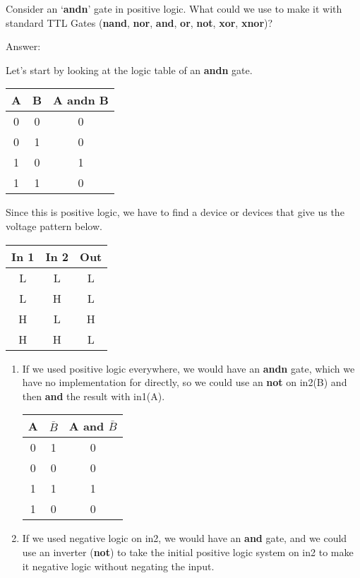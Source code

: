 \begin{example}
Consider an `\textbf{andn}' gate in positive logic.  What could we use to make it with standard TTL Gates (\textbf{nand}, \textbf{nor}, \textbf{and}, \textbf{or}, \textbf{not}, \textbf{xor}, \textbf{xnor})?

Answer:

Let's start by looking at the logic table of an \textbf{andn} gate.

\begin{tabular}{c|c||c}
A & B & A andn B \\\hline
0 & 0 & 0 \\
0 & 1 & 0 \\
1 & 0 & 1 \\
1 & 1 & 0 \\
\end{tabular}

Since this is positive logic, we have to find a device or devices that give us the voltage pattern below.

\begin{tabular}{c|c||c}
In 1 & In 2 & Out \\\hline
L    & L    & L \\
L    & H    & L \\
H    & L    & H \\
H    & H    & L \\
\end{tabular}

\begin{enumerate}
\item If we used positive logic everywhere, we would have an \textbf{andn} gate, which we have no implementation for directly, so we could use an \textbf{not} on in2(B) and then \textbf{and} the result with in1(A).

\begin{tabular}{c|c||c}
A & $\bar{B}$ & A and $\bar{B}$ \\\hline
0 & 1 & 0 \\
0 & 0 & 0 \\
1 & 1 & 1 \\
1 & 0 & 0 \\
\end{tabular}

\item If we used negative logic on in2, we would have an \textbf{and} gate, and we could use an inverter (\textbf{not}) to take the initial positive logic system on in2 to make it negative logic without negating the input.


\end{enumerate}
\end{example}
